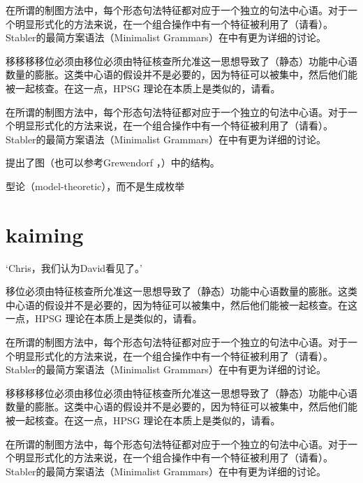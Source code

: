 \documentclass{scrbook}
\let\citew\citealp
\newcommand{\page}{}
\begin{document}
在所谓的制图方法中，每个形态句法特征都对应于一个独立的句法中心语\citep[\page 54, 61]{CR2010a}。对于一个明显形式化的方法来说，在一个组合操作中有一个特征被利用了（请看\citew[\page 335]{Stabler2001a}）。Stabler的最简方案语法（Minimalist Grammars）在中有更为详细的讨论。

移移移移位必须由移位必须由特征核查所允准这一思想导致了（静态）功能中心语数量的膨胀。这类中心语的假设并不是必要的，因为特征可以被集中，然后他们能被一起核查。在这一点，HPSG 理论在本质上是类似的，请看\citew[\S~II.3.3.4, \S~II.4.2]{Sternefeld2006a-u}。

在所谓的制图方法中，每个形态句法特征都对应于一个独立的句法中心语\citep[\page 54, 61]{CR2010a}。对于一个明显形式化的方法来说，在一个组合操作中有一个特征被利用了（请看\citew[\page 335]{Stabler2001a}）。Stabler的最简方案语法（Minimalist Grammars）在中有更为详细的讨论。

\citet[\page 297]{Rizzi97a-u}提出了图（也可以参考Grewendorf \citeyear[\page 85, 240]{Grewendorf2002a}，\citeyear{Grewendorf2009a}）中的结构。

型论（model-theoretic），而不是生成枚举

\section{kaiming}

    `Chris，我们认为David看见了。'

移位必须由特征核查所允准这一思想导致了（静态）功能中心语数量的膨胀。这类中心语的假设并不是必要的，因为特征可以被集中，然后他们能被一起核查。在这一点，HPSG 理论在本质上是类似的，请看\citew[\S~II.3.3.4, \S~II.4.2]{Sternefeld2006a-u}。

在所谓的制图方法中，每个形态句法特征都对应于一个独立的句法中心语\citep[\page 54, 61]{CR2010a}。对于一个明显形式化的方法来说，在一个组合操作中有一个特征被利用了（请看\citew[\page 335]{Stabler2001a}）。Stabler的最简方案语法（Minimalist Grammars）在中有更为详细的讨论。

移移移移位必须由移位必须由特征核查所允准这一思想导致了（静态）功能中心语数量的膨胀。这类中心语的假设并不是必要的，因为特征可以被集中，然后他们能被一起核查。在这一点，HPSG 理论在本质上是类似的，请看\citew[\S~II.3.3.4, \S~II.4.2]{Sternefeld2006a-u}。

在所谓的制图方法中，每个形态句法特征都对应于一个独立的句法中心语\citep[\page 54, 61]{CR2010a}。对于一个明显形式化的方法来说，在一个组合操作中有一个特征被利用了（请看\citew[\page 335]{Stabler2001a}）。Stabler的最简方案语法（Minimalist Grammars）在中有更为详细的讨论。
\end{document}
